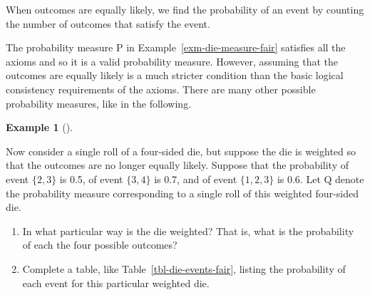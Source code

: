\documentclass[
  letterpaper,
  DIV=11,
  numbers=noendperiod]{scrreprt}
\providecommand{\tightlist}{%
  \setlength{\itemsep}{0pt}\setlength{\parskip}{0pt}}
\theoremstyle{plain}
\theoremstyle{definition}
\newtheorem{example}{Example}[chapter]
\theoremstyle{definition}
\theoremstyle{definition}
\theoremstyle{remark}
\begin{document}
When outcomes are equally likely, we find the probability of an event by
counting the number of outcomes that satisfy the event.

The probability measure \(\textrm{P}\) in
Example~\ref{exm-die-measure-fair} satisfies all the axioms and so it is
a valid probability measure. However, assuming that the outcomes are
equally likely is a much stricter condition than the basic logical
consistency requirements of the axioms. There are many other possible
probability measures, like in the following.

\begin{tcolorbox}[enhanced jigsaw, opacityback=0, left=2mm, colframe=quarto-callout-note-color-frame, toprule=.15mm, breakable, colback=white, leftrule=.75mm, arc=.35mm, rightrule=.15mm, bottomrule=.15mm]

\begin{example}[]\protect\hypertarget{exm-die-weighted}{}\label{exm-die-weighted}

Now consider a single roll of a four-sided die, but suppose the die is
weighted so that the outcomes are no longer equally likely. Suppose that
the probability of event \(\{2, 3\}\) is 0.5, of event \(\{3, 4\}\) is
0.7, and of event \(\{1, 2, 3\}\) is 0.6. Let \(\textrm{Q}\) denote the
probability measure corresponding to a single roll of this weighted
four-sided die.

\begin{enumerate}
\def\labelenumi{\arabic{enumi}.}
\tightlist
\item
  In what particular way is the die weighted? That is, what is the
  probability of each the four possible outcomes?
\item
  Complete a table, like Table~\ref{tbl-die-events-fair}, listing the
  probability of each event for this particular weighted die.
\end{enumerate}

\end{example}

\end{tcolorbox}
\end{document}
